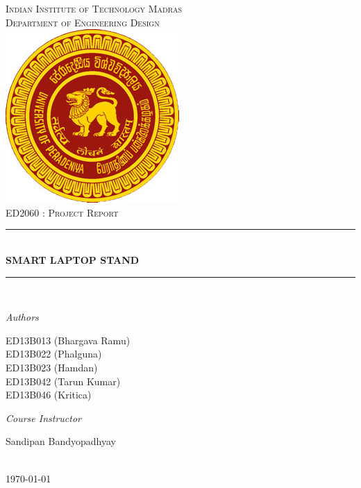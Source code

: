\newcommand{\HRule}{\rule{\linewidth}{0.5mm}} 

\begin{titlepage}
\center
\textsc{
\Huge{Indian Institute of Technology Madras}\\[.5cm]
\Large
Department of Engineering Design\\[1cm] 
\includegraphics{uop-logo}\\[3cm]
ED2060 : Project Report}\\[.5cm] 

\sffamily
\HRule \\[0.4cm]
\textbf{\Huge SMART LAPTOP STAND}\\[0.2cm] 
\HRule \\[3cm]
 
\large
\begin{minipage}[t]{.4\textwidth}
\begin{flushleft}
\emph{Authors}

ED13B013 (Bhargava Ramu)\\
ED13B022 (Phalguna)\\
ED13B023 (Hamdan)\\
ED13B042 (Tarun Kumar)\\
ED13B046 (Kritica)\\
\end{flushleft}

\end{minipage}\hfill\begin{minipage}[t]{.4\textwidth}

\begin{flushright}
\emph{Course Instructor} 

Sandipan Bandyopadhyay\\ 

\end{flushright}
\end{minipage}
\\[2cm]

{\today}\\[3cm]

\end{titlepage}


